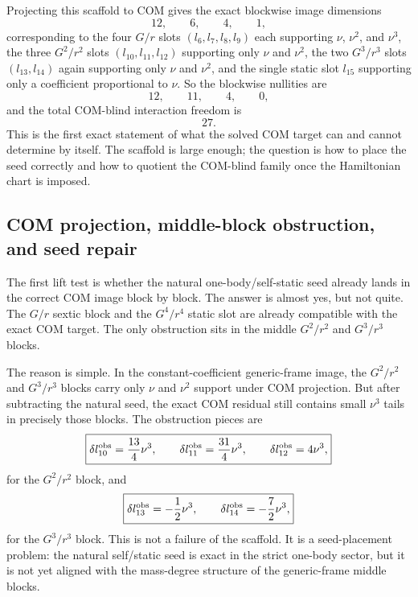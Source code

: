 \documentclass[11pt]{article}
\begin{document}
Projecting this scaffold to COM gives the exact blockwise image dimensions
\[
\boxed{12,\qquad 6,\qquad 4,\qquad 1,}
\]
corresponding to the four $G/r$ slots $(l_6,l_7,l_8,l_9)$ each supporting
$\nu$, $\nu^2$, and $\nu^3$, the three $G^2/r^2$ slots
$(l_{10},l_{11},l_{12})$ supporting only $\nu$ and $\nu^2$, the two
$G^3/r^3$ slots $(l_{13},l_{14})$ again supporting only $\nu$ and $\nu^2$, and
the single static slot $l_{15}$ supporting only a coefficient proportional to
$\nu$.  So the blockwise nullities are
\[
\boxed{12,\qquad 11,\qquad 4,\qquad 0,}
\]
and the total COM-blind interaction freedom is
\[
\boxed{27.}
\]
This is the first exact statement of what the solved COM target can and cannot
determine by itself.  The scaffold is large enough; the question is how to place
the seed correctly and how to quotient the COM-blind family once the Hamiltonian
chart is imposed.

\subsection{COM projection, middle-block obstruction, and seed repair}
\label{sec:compmass-obstruction}

The first lift test is whether the natural one-body/self-static seed already
lands in the correct COM image block by block.  The answer is almost yes, but
not quite.  The $G/r$ sextic block and the $G^4/r^4$ static slot are already
compatible with the exact COM target.  The only obstruction sits in the middle
$G^2/r^2$ and $G^3/r^3$ blocks.

The reason is simple.  In the constant-coefficient generic-frame image, the
$G^2/r^2$ and $G^3/r^3$ blocks carry only $\nu$ and $\nu^2$ support under COM
projection.  But after subtracting the natural seed, the exact COM residual
still contains small $\nu^3$ tails in precisely those blocks.  The obstruction
pieces are
\[
\boxed{
\delta l_{10}^{\rm obs}=\frac{13}{4}\nu^3,
\qquad
\delta l_{11}^{\rm obs}=\frac{31}{4}\nu^3,
\qquad
\delta l_{12}^{\rm obs}=4\nu^3,}
\]
for the $G^2/r^2$ block, and
\[
\boxed{
\delta l_{13}^{\rm obs}=-\frac12\nu^3,
\qquad
\delta l_{14}^{\rm obs}=-\frac72\nu^3,}
\]
for the $G^3/r^3$ block.  This is not a failure of the scaffold.  It is a
seed-placement problem: the natural self/static seed is exact in the strict
one-body sector, but it is not yet aligned with the mass-degree structure of the
generic-frame middle blocks.
\end{document}
